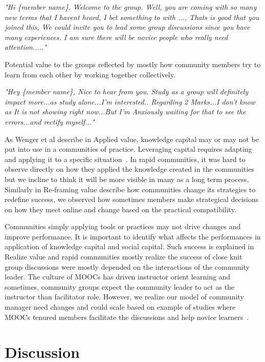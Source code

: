\documentclass[manuscript,screen,review]{acmart}
\begin{document}
\textit{"Hi \{member name\}, Welcome to the group, Well, you are coming with so many new terms that I havent heard, I bet something to with {...}, 
Thats is good that you joined this, We could invite you to lead some group discussions since you have many experiences. I am sure there will be novice people who really need attention....."}

Potential value to the groups reflected by mostly how community members try to learn from each other by working together collectively. 

\textit{"Hey \{member name\}, Nice to hear from you. Study as a group will definitely impact more...as study alone...I'm interested.. Regarding 2 Marks...I don't know as It is not showing right now...But I'm Anxiously waiting for that to see the errors...and rectify myself..."}

As Wenger et al describe in Applied value, knowledge capital may or may not be put into use in a communities of practice. Leveraging capital requires adapting and applying it to a specific situation~\cite{wenger2011promoting}. In rapid communities, it was hard to observe directly on how they applied the knowledge created in the communities but we incline to think it will be more visible in many as a long term process. Similarly in Re-framing value describe how communities change its strategies to redefine success, we observed how sometimes members make strategical decisions on how they meet online and change based on the practical compatibility. 

Communities simply applying tools or practices may not drive changes and improve performance. It is important to identify what affects the performances in application of knowledge capital and social capital. Such success is explained in Realize value and rapid communities mostly realize the success of close knit group discussions were mostly depended on the interactions of the community leader. The culture of MOOCs has driven instructor orient learning and sometimes, community groups expect the community leader to act as the instructor than facilitator role. However, we realize our model of community manager need changes and could scale based on example of studies where MOOCs tenured members facilitate the discussions and help novice learners~\cite{nelimarkka2015alumni}.  

\section{Discussion}
\end{document}
